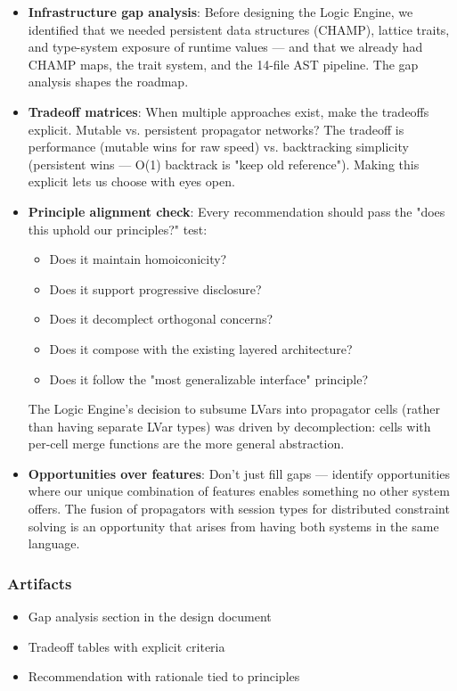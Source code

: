 \documentclass[11pt]{article}
\begin{document}
\begin{itemize}
\item \textbf{Infrastructure gap analysis}: Before designing the Logic Engine, we
identified that we needed persistent data structures (CHAMP), lattice
traits, and type-system exposure of runtime values --- and that we
already had CHAMP maps, the trait system, and the 14-file AST pipeline.
The gap analysis shapes the roadmap.

\item \textbf{Tradeoff matrices}: When multiple approaches exist, make the tradeoffs
explicit. Mutable vs. persistent propagator networks? The tradeoff is
performance (mutable wins for raw speed) vs. backtracking simplicity
(persistent wins --- O(1) backtrack is "keep old reference"). Making
this explicit lets us choose with eyes open.

\item \textbf{Principle alignment check}: Every recommendation should pass the
"does this uphold our principles?" test:
\begin{itemize}
\item Does it maintain homoiconicity?
\item Does it support progressive disclosure?
\item Does it decomplect orthogonal concerns?
\item Does it compose with the existing layered architecture?
\item Does it follow the "most generalizable interface" principle?
\end{itemize}

The Logic Engine's decision to subsume LVars into propagator cells
(rather than having separate LVar types) was driven by
decomplection: cells with per-cell merge functions are the more
general abstraction.

\item \textbf{Opportunities over features}: Don't just fill gaps --- identify
opportunities where our unique combination of features enables
something no other system offers. The fusion of propagators with
session types for distributed constraint solving is an opportunity
that arises from having both systems in the same language.
\end{itemize}
\subsubsection{Artifacts}
\label{sec:org2fa224c}

\begin{itemize}
\item Gap analysis section in the design document
\item Tradeoff tables with explicit criteria
\item Recommendation with rationale tied to principles
\end{itemize}
\end{document}
